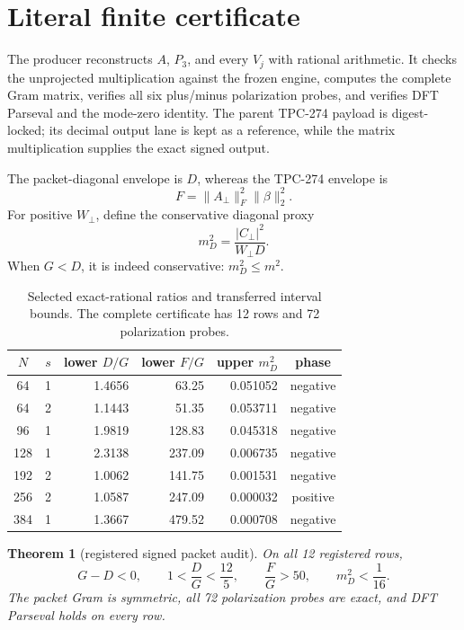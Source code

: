 \documentclass[11pt]{article}
\newcommand{\Aperp}{A_{\perp}}
\newcommand{\Cperp}{C_{\perp}}
\newcommand{\Wperp}{W_{\perp}}
\newcommand{\Dpack}{D}
\newcommand{\Fenv}{F}
\newtheorem{theorem}{Theorem}
\begin{document}
\section{Literal finite certificate}

The producer reconstructs \(A\), \(P_3\), and every \(V_j\) with rational
arithmetic.  It checks the unprojected multiplication against the frozen
engine, computes the complete Gram matrix, verifies all six plus/minus
polarization probes, and verifies DFT Parseval and the mode-zero identity.
The parent TPC-274 payload is digest-locked; its decimal output lane is kept as
a reference, while the matrix multiplication supplies the exact signed output.

The packet-diagonal envelope is \(\Dpack\), whereas the TPC-274 envelope is
\[
 \Fenv=\|\Aperp\|_F^2\|\beta\|_2^2.
\]
For positive \(\Wperp\), define the conservative diagonal proxy
\[
 m_D^2=\frac{|\Cperp|^2}{\Wperp\Dpack}.
\]
When \(G<\Dpack\), it is indeed conservative: \(m_D^2\leq m^2\).

\begin{table}[t]
\centering
\scriptsize
\begin{tabular}{c c r r r c}
\toprule
 $N$ & $s$ & lower $\Dpack/G$ & lower $\Fenv/G$ & upper $m_D^2$ & phase\\
\midrule
 64  & 1 & 1.4656 & 63.25  & 0.051052 & negative\\
 64  & 2 & 1.1443 & 51.35  & 0.053711 & negative\\
 96  & 1 & 1.9819 & 128.83 & 0.045318 & negative\\
 128 & 1 & 2.3138 & 237.09 & 0.006735 & negative\\
 192 & 2 & 1.0062 & 141.75 & 0.001531 & negative\\
 256 & 2 & 1.0587 & 247.09 & 0.000032 & positive\\
 384 & 1 & 1.3667 & 479.52 & 0.000708 & negative\\
\bottomrule
\end{tabular}
\caption{Selected exact-rational ratios and transferred interval bounds.  The
complete certificate has 12 rows and 72 polarization probes.}
\end{table}

\begin{theorem}[registered signed packet audit]
On all 12 registered rows,
\[
 G-\Dpack<0,\qquad 1<\frac{\Dpack}{G}<\frac{12}{5},\qquad
 \frac{\Fenv}{G}>50,\qquad m_D^2<\frac1{16}.
\]
The packet Gram is symmetric, all 72 polarization probes are exact, and DFT
Parseval holds on every row.
\end{theorem}
\end{document}
